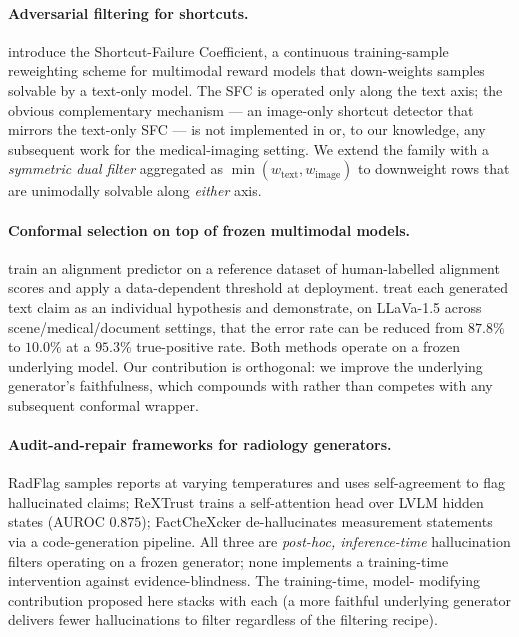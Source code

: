 \documentclass{article}
\begin{document}
\paragraph{Adversarial filtering for shortcuts.} \citet{li2025sfc}
introduce the Shortcut-Failure Coefficient, a continuous training-sample
reweighting scheme for multimodal reward models that down-weights samples
solvable by a text-only model. The SFC is operated only along the text
axis; the obvious complementary mechanism --- an image-only shortcut
detector that mirrors the text-only SFC --- is not implemented in
\citet{li2025sfc} or, to our knowledge, any subsequent work for the
medical-imaging setting. We extend the family with a \emph{symmetric dual
filter} aggregated as $\min(w_{\text{text}}, w_{\text{image}})$ to
downweight rows that are unimodally solvable along \emph{either} axis.

\paragraph{Conformal selection on top of frozen multimodal models.}
\citet{gui2024conformal} train an alignment predictor on a reference
dataset of human-labelled alignment scores and apply a data-dependent
threshold at deployment. \citet{li2025conflvlm} treat each generated
text claim as an individual hypothesis and demonstrate, on LLaVa-1.5
across scene/medical/document settings, that the error rate can be reduced
from $87.8\%$ to $10.0\%$ at a $95.3\%$ true-positive rate. Both methods
operate on a frozen underlying model. Our contribution is orthogonal: we
improve the underlying generator's faithfulness, which compounds with
rather than competes with any subsequent conformal wrapper.

\paragraph{Audit-and-repair frameworks for radiology generators.} RadFlag
\citep{zhang2025radflag} samples reports at varying temperatures and uses
self-agreement to flag hallucinated claims; ReXTrust
\citep{hardy2025rextrust} trains a self-attention head over LVLM hidden
states (AUROC $0.875$); FactCheXcker \citep{heiman2025factchexcker}
de-hallucinates measurement statements via a code-generation pipeline.
All three are \emph{post-hoc, inference-time} hallucination filters
operating on a frozen generator; none implements a training-time
intervention against evidence-blindness. The training-time, model-
modifying contribution proposed here stacks with each (a more faithful
underlying generator delivers fewer hallucinations to filter regardless
of the filtering recipe).
\end{document}
